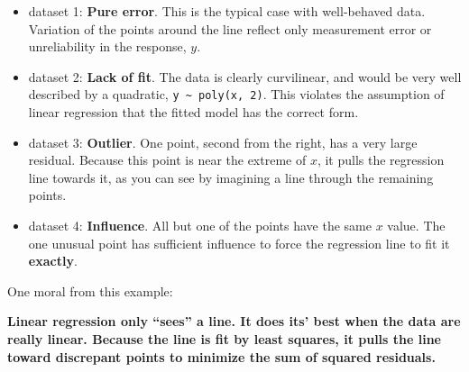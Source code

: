 \documentclass[
  letterpaper,
  10pt,
  krantz2]{krantz}
\renewenvironment{quote}{\begin{VF}}{\end{VF}}
\begin{document}
\begin{itemize}
\item
  dataset 1: \textbf{Pure error}. This is the typical case with
  well-behaved data. Variation of the points around the line reflect
  only measurement error or unreliability in the response, \(y\).
\item
  dataset 2: \textbf{Lack of fit}. The data is clearly curvilinear, and
  would be very well described by a quadratic,
  \texttt{y\ \textasciitilde{}\ poly(x,\ 2)}. This violates the
  assumption of linear regression that the fitted model has the correct
  form.
\item
  dataset 3: \textbf{Outlier}. One point, second from the right, has a
  very large residual. Because this point is near the extreme of \(x\),
  it pulls the regression line towards it, as you can see by imagining a
  line through the remaining points.
\item
  dataset 4: \textbf{Influence}. All but one of the points have the same
  \(x\) value. The one unusual point has sufficient influence to force
  the regression line to fit it \textbf{exactly}.
\end{itemize}

One moral from this example:

\begin{quote}
\textbf{Linear regression only ``sees'' a line. It does its' best when
the data are really linear. Because the line is fit by least squares, it
pulls the line toward discrepant points to minimize the sum of squared
residuals.}
\end{quote}
\end{document}
